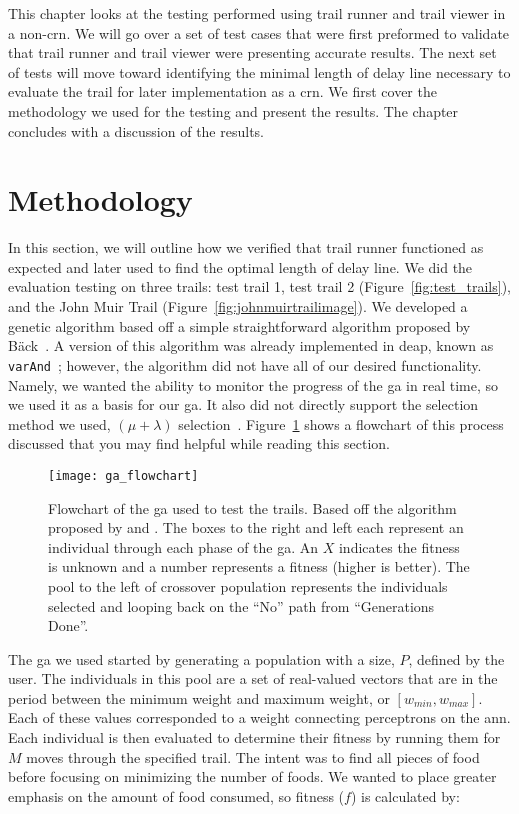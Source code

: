 This chapter looks at the testing performed using trail runner and trail viewer in a non-\gls{crn}. We will go over a set of test cases that were first preformed to validate that trail runner and trail viewer were presenting accurate results. The next set of tests will move toward identifying the minimal length of delay line necessary to evaluate the trail for later implementation as a \gls{crn}. We first cover the methodology we used for the testing and present the results. The chapter concludes with a discussion of the results.

\section{Methodology}
\label{sec:trail_runner_methods}
In this section, we will outline how we verified that trail runner functioned as expected and later used to find the optimal length of delay line. We did the evaluation testing on three trails: test trail 1, test trail 2 (Figure~\ref{fig:test_trails}), and the John Muir Trail (Figure~\ref{fig:johnmuirtrailimage}). We developed a genetic algorithm based off a simple straightforward algorithm proposed by B\"{a}ck~\cite{Baeck2000-co}. A version of this algorithm was already implemented in \gls{deap}, known as \texttt{varAnd}~\cite{Fortin2012-yv}; however, the algorithm did not have all of our desired functionality. Namely, we wanted the ability to monitor the progress of the \gls{ga} in real time, so we used it as a basis for our \gls{ga}. It also did not directly support the selection method we used, $(\mu + \lambda)$ selection~\cite{Schwefel1976-er}. Figure~\ref{fig:ga_flowchart} shows a flowchart of this process discussed that you may find helpful while reading this section.

\begin{figure}[p]
\centering
\texttt{[image: ga\_flowchart]}
\caption[Genetic Algorithm Flow Chart]{Flowchart of the \gls{ga} used to test the trails. Based off the algorithm proposed by \cite{Baeck2000-co} and \cite{Fortin2012-yv}. The boxes to the right and left each represent an individual through each phase of the \gls{ga}. An $X$ indicates the fitness is unknown and a number represents a fitness (higher is better). The pool to the left of crossover population represents the individuals selected and looping back on the ``No'' path from ``Generations Done''.}
\label{fig:ga_flowchart}
\end{figure}

The \gls{ga} we used started by generating a population with a size, $P$, defined by the user. The individuals in this pool are a set of real-valued vectors that are in the period between the minimum weight and maximum weight, or $[w_{min}, w_{max}]$. Each of these values corresponded to a weight connecting perceptrons on the \gls{ann}. Each individual is then evaluated to determine their fitness by running them for $M$ moves through the specified trail. The intent was to find all pieces of food before focusing on minimizing the number of foods. We wanted to place greater emphasis on the amount of food consumed, so fitness ($f$) is calculated by:

